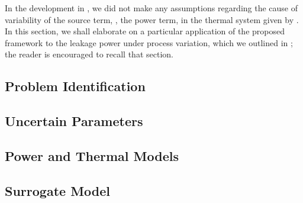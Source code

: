 In the development in , we did not make any assumptions regarding the cause of variability of the source term, \ie, the power term, in the thermal system given by . In this section, we shall elaborate on a particular application of the proposed framework to the leakage power under process variation, which we outlined in ; the reader is encouraged to recall that section.

\subsection{Problem Identification} 


\subsection{Uncertain Parameters} 


\subsection{Power and Thermal Models}  


\subsection{Surrogate Model} 

